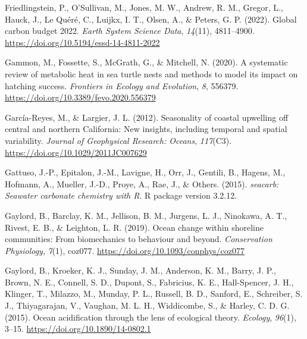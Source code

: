 \documentclass{CSUNthesis}
\begin{document}
\vspace{0.1em}

Friedlingstein, P., O'Sullivan, M., Jones, M. W., Andrew, R. M., Gregor, L., Hauck, J., Le Quéré, C., Luijkx, I. T., Olsen, A., \& Peters, G. P. (2022). Global carbon budget 2022. \textit{Earth System Science Data}, \textit{14}(11), 4811--4900. \url{https://doi.org/10.5194/essd-14-4811-2022}

\vspace{0.1em}

Gammon, M., Fossette, S., McGrath, G., \& Mitchell, N. (2020). A systematic review of metabolic heat in sea turtle nests and methods to model its impact on hatching success. \textit{Frontiers in Ecology and Evolution}, \textit{8}, 556379. \url{https://doi.org/10.3389/fevo.2020.556379}

\vspace{0.1em}

García-Reyes, M., \& Largier, J. L. (2012). Seasonality of coastal upwelling off central and northern California: New insights, including temporal and spatial variability. \textit{Journal of Geophysical Research: Oceans}, \textit{117}(C3). \url{https://doi.org/10.1029/2011JC007629}

\vspace{0.1em}

Gattuso, J.-P., Epitalon, J.-M., Lavigne, H., Orr, J., Gentili, B., Hagens, M., Hofmann, A., Mueller, J.-D., Proye, A., Rae, J., \& Others. (2015). \textit{seacarb: Seawater carbonate chemistry with R}. R package version 3.2.12.

\vspace{0.1em}

Gaylord, B., Barclay, K. M., Jellison, B. M., Jurgens, L. J., Ninokawa, A. T., Rivest, E. B., \& Leighton, L. R. (2019). Ocean change within shoreline communities: From biomechanics to behaviour and beyond. \textit{Conservation Physiology}, \textit{7}(1), coz077. \url{https://doi.org/10.1093/conphys/coz077}

\vspace{0.1em}

Gaylord, B., Kroeker, K. J., Sunday, J. M., Anderson, K. M., Barry, J. P., Brown, N. E., Connell, S. D., Dupont, S., Fabricius, K. E., Hall-Spencer, J. H., Klinger, T., Milazzo, M., Munday, P. L., Russell, B. D., Sanford, E., Schreiber, S. J., Thiyagarajan, V., Vaughan, M. L. H., Widdicombe, S., \& Harley, C. D. G. (2015). Ocean acidification through the lens of ecological theory. \textit{Ecology}, \textit{96}(1), 3--15. \url{https://doi.org/10.1890/14-0802.1}
\end{document}
